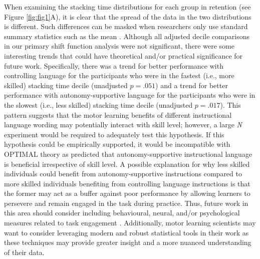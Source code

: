 \documentclass[man,floatsintext,donotrepeattitle,letterpaper,12pt]{apa7}
\begin{document}
When examining the stacking time distributions for each group in retention (see Figure \ref{fig:fig1}A), it is clear that the spread of the data in the two distributions is different. Such differences can be masked when researchers only use standard summary statistics such as the mean \autocite[see][for the famous Anscombe's quartet example]{anscombe1973}. Although all adjusted decile comparisons in our primary shift function analysis were not significant, there were some interesting trends that could have theoretical and/or practical significance for future work. Specifically, there was a trend for better performance with controlling language for the participants who were in the fastest (i.e., more skilled) stacking time decile (unadjusted $p = .051$) and a trend for better performance with autonomy-supportive language for the participants who were in the slowest (i.e., less skilled) stacking time decile (unadjusted $p = .017$). This pattern suggests that the motor learning benefits of different instructional language wording may potentially interact with skill level; however, a large \emph{N} experiment would be required to adequately test this hypothesis. If this hypothesis could be empirically supported, it would be incompatible with OPTIMAL theory as \textcite{wulf2016} predicted that autonomy-supportive instructional language is beneficial irrespective of skill level. A possible explanation for why less skilled individuals could benefit from autonomy-supportive instructions compared to more skilled individuals benefiting from controlling language instructions is that the former may act as a buffer against poor performance by allowing learners to persevere and remain engaged in the task during practice. Thus, future work in this area should consider including behavioural, neural, and/or psychological measures related to task engagement \autocite[e.g.,][]{fairclough2009,leiker2016,obrien2009}. Additionally, motor learning scientists may want to consider leveraging modern and robust statistical tools \autocite{wilcox2021} in their work as these techniques may provide greater insight and a more nuanced understanding of their data.
\end{document}
